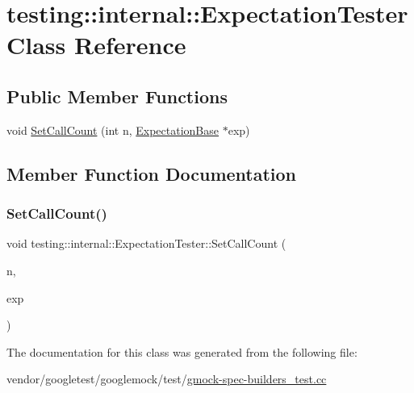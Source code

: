 \hypertarget{classtesting_1_1internal_1_1_expectation_tester}{}\section{testing\+:\+:internal\+:\+:Expectation\+Tester Class Reference}
\label{classtesting_1_1internal_1_1_expectation_tester}
\subsection*{Public Member Functions}
\begin{DoxyCompactItemize}
\item 
void \hyperlink{classtesting_1_1internal_1_1_expectation_tester_af5d762355ef83f414c4b0fc14c8fc943}{Set\+Call\+Count} (int n, \hyperlink{classtesting_1_1internal_1_1_expectation_base}{Expectation\+Base} $\ast$exp)
\end{DoxyCompactItemize}


\subsection{Member Function Documentation}
\mbox{\label{classtesting_1_1internal_1_1_expectation_tester_af5d762355ef83f414c4b0fc14c8fc943}} 
\subsubsection{\texorpdfstring{Set\+Call\+Count()}{SetCallCount()}}
{\footnotesize\ttfamily void testing\+::internal\+::\+Expectation\+Tester\+::\+Set\+Call\+Count (\begin{DoxyParamCaption}\item[{int}]{n,  }\item[{\hyperlink{classtesting_1_1internal_1_1_expectation_base}{Expectation\+Base} $\ast$}]{exp }\end{DoxyParamCaption})\hspace{0.3cm}{\ttfamily [inline]}}



The documentation for this class was generated from the following file\+:\begin{DoxyCompactItemize}
\item 
vendor/googletest/googlemock/test/\hyperlink{gmock-spec-builders__test_8cc}{gmock-\/spec-\/builders\+\_\+test.\+cc}\end{DoxyCompactItemize}
